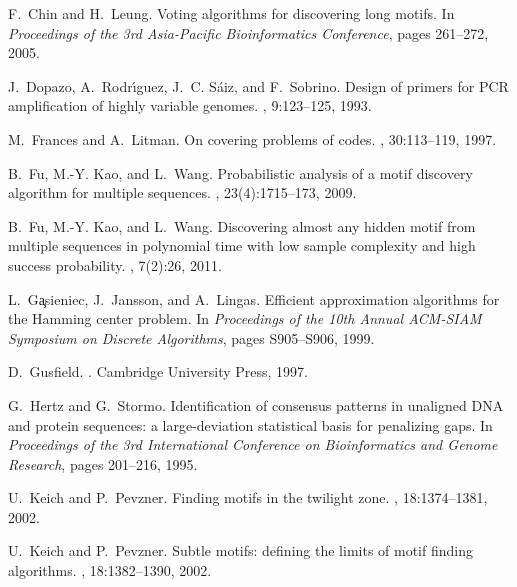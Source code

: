 \documentclass[11pt]{article}
\begin{document}
\begin{thebibliography}{10}

F.~Chin and H.~Leung.
\newblock Voting algorithms for discovering long motifs.
\newblock In {\em Proceedings of the 3rd Asia-Pacific Bioinformatics
  Conference}, pages 261--272, 2005.

J.~Dopazo, A.~Rodr\'{\i}guez, J.~C. S\'{a}iz, and F.~Sobrino.
\newblock Design of primers for {{\rm PCR}} amplification of highly variable
  genomes.
, 9:123--125, 1993.

M.~Frances and A.~Litman.
\newblock On covering problems of codes.
, 30:113--119, 1997.

B.~Fu, M.-Y. Kao, and L.~Wang.
\newblock Probabilistic analysis of a motif discovery algorithm for multiple
  sequences.
, 23(4):1715--173, 2009.

B.~Fu, M.-Y. Kao, and L.~Wang.
\newblock Discovering almost any hidden motif from multiple sequences in
  polynomial time with low sample complexity and high success probability.
, 7(2):26, 2011.

L.~G\c{a}sieniec, J.~Jansson, and A.~Lingas.
\newblock Efficient approximation algorithms for the {{\rm H}}amming center
  problem.
\newblock In {\em {Proceedings of the 10th Annual ACM-SIAM Symposium on
  Discrete Algorithms}}, pages S905--S906, 1999.

D.~Gusfield.
.
\newblock Cambridge University Press, 1997.

G.~Hertz and G.~Stormo.
\newblock Identification of consensus patterns in unaligned {{\rm DNA}} and
  protein sequences: a large-deviation statistical basis for penalizing gaps.
\newblock In {\em Proceedings of the 3rd International Conference on
  Bioinformatics and Genome Research}, pages 201--216, 1995.

U.~Keich and P.~Pevzner.
\newblock Finding motifs in the twilight zone.
, 18:1374--1381, 2002.

U.~Keich and P.~Pevzner.
\newblock Subtle motifs: defining the limits of motif finding algorithms.
, 18:1382--1390, 2002.


\end{thebibliography}
\end{document}
